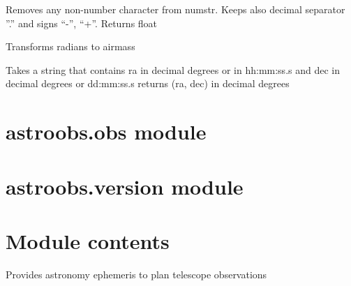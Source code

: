 \documentclass[letterpaper,10pt,english]{sphinxmanual}
\begin{document}

\begin{fulllineitems}
\label{astroobs:astroobs.core.make_num}
Removes any non-number character from numstr. Keeps also decimal separator ''.'' and signs ``-'', ``+''.
Returns float

\end{fulllineitems}


\begin{fulllineitems}
\label{astroobs:astroobs.core.rad_to_airmass}
Transforms radians to airmass

\end{fulllineitems}


\begin{fulllineitems}
\label{astroobs:astroobs.core.radecFromStr}
Takes a string that contains ra in decimal degrees or in hh:mm:ss.s and dec in decimal degrees or dd:mm:ss.s
returns (ra, dec) in decimal degrees

\end{fulllineitems}



\section{astroobs.obs module}
\label{astroobs:astroobs-obs-module}\label{astroobs:module-astroobs.obs}

\section{astroobs.version module}
\label{astroobs:astroobs-version-module}\label{astroobs:module-astroobs.version}

\section{Module contents}
\label{astroobs:module-contents}\label{astroobs:module-astroobs}
Provides astronomy ephemeris to plan telescope observations
\end{document}
